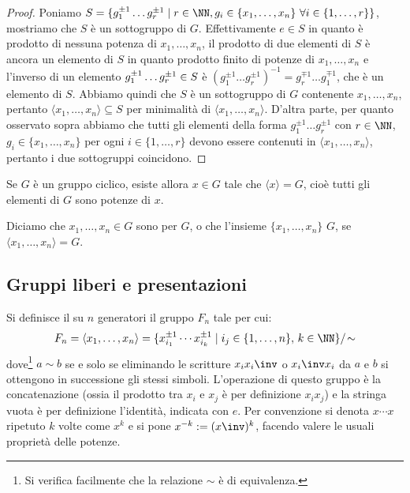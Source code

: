 \documentclass[11pt]{scrartcl}
\begin{document}
	\begin{proof}
		Poniamo $S = \{g_1^{\pm 1} \ldots g_r^{\pm 1}\mid r \in \NN, g_i \in \{x_1, \ldots, x_n\}
		~\forall i \in \{1, \ldots, r\}\}$, mostriamo che $S$ è un sottogruppo di $G$. 
		Effettivamente $e \in S$ in quanto è prodotto di nessuna potenza di $x_1, \ldots, x_n$, 
		il prodotto di due elementi di $S$ è ancora un elemento di $S$ in quanto
		prodotto finito di potenze di $x_1, \ldots, x_n$ e l'inverso di un elemento
		$g_1^{\pm 1}\ldots g_r^{\pm 1} \in\nolinebreak S$ è $(g_1^{\pm 1}\ldots 
		g_r^{\pm 1})^{-1} = g_r^{\mp 1}\ldots g_1^{\mp 1}$, che è un elemento di $S$.
		Abbiamo quindi che $S$ è un sottogruppo di $G$ contenente $x_1, \ldots, x_n$,
		pertanto $\langle x_1, \ldots, x_n\rangle\subseteq S$ per minimalità di $\langle x_1,
		\ldots, x_n\rangle$. D'altra parte, per quanto osservato sopra abbiamo che
		tutti gli elementi della forma $g_1^{\pm 1}\ldots g_r^{\pm 1}$ con $r \in \NN$, 
		$g_i \in \{x_1, \ldots, x_n\}$ per ogni $i \in \{1, \ldots, r\}$ devono essere
		contenuti in $\langle x_1, \ldots, x_n\rangle$, pertanto i due sottogruppi
		coincidono.
	\end{proof}
	
	\begin{remark}
		Se $G$ è un gruppo ciclico, esiste allora $x \in G$ tale che 
		$\langle x\rangle = G$, cioè tutti gli elementi di $G$ sono potenze di $x$.
	\end{remark}
	
	Diciamo che $x_1, \ldots, x_n \in G$ sono  per $G$, o che 
	l'insieme $\{x_1, \ldots, x_n\}$  $G$, se $\langle x_1, \ldots, x_n\rangle = G$.
	
	\newpage
	\subsection{Gruppi liberi e presentazioni}
	
	\begin{definition}
		Si definisce il  su $n$ generatori
		il gruppo $F_n$ tale per cui:
		\[ F_n = \langle{x_1, \ldots, x_n\rangle} = \{ x_{i_1}^{\pm 1} \cdots x_{i_k}^{\pm 1} \mid i_j \in \{1, \ldots, n\}, \, k \in \NN \} / \! \sim \]
		dove\footnote{
			Si verifica facilmente che la relazione $\sim$ è di equivalenza.
		} $a \sim b$ se e solo se eliminando le scritture $x_i x_i\inv$ 
		o $x_i\inv x_i$ da $a$ e $b$ si ottengono in successione gli stessi simboli.
		L'operazione di
		questo gruppo è la concatenazione (ossia il prodotto tra
		$x_i$ e $x_j$ è per definizione $x_i x_j$) e la stringa
		vuota è per definizione l'identità, indicata con $e$.
		Per convenzione si denota $x \cdots x$ ripetuto $k$ volte come $x^k$ e si pone $x^{-k} := (x\inv)^k$, facendo
		valere le usuali proprietà delle potenze.
	\end{definition}
	
\end{document}
